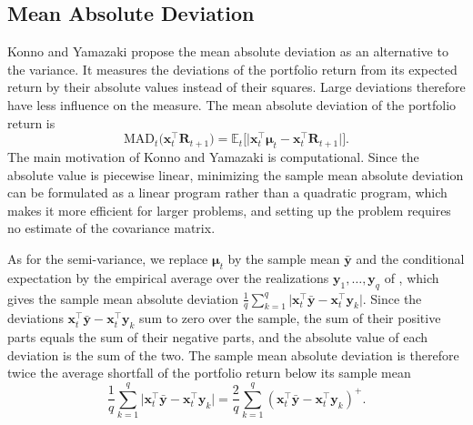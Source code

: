 \subsection{Mean Absolute Deviation}\label{sec:risk-mad}

Konno and Yamazaki \cite{KonnoYamazaki1991} propose the mean absolute deviation as an alternative to the variance. It
measures the deviations of the portfolio return from its expected return by their absolute values instead of their
squares. Large deviations therefore have less
influence on the measure. The mean absolute deviation of the portfolio return is
\begin{equation*}
    \text{MAD}_t\bigl( \bm{x}_t^\top \bm{R}_{t+1} \bigr)
    = \mathbb{E}_t\bigl[ \lvert \bm{x}_t^\top \bm{\mu}_t - \bm{x}_t^\top \bm{R}_{t+1} \rvert \bigr].
\end{equation*}
The main motivation of Konno and Yamazaki is computational. Since the absolute value is piecewise linear, minimizing the
sample mean absolute deviation can be formulated as a linear program rather than a quadratic program, which makes it more efficient for larger problems, 
and setting up the problem requires no estimate of the covariance matrix.

As for the semi-variance, we replace $\bm{\mu}_t$ by the sample mean $\bar{\bm{y}}$ and the conditional expectation by
the empirical average over the realizations $\bm{y}_1, \dots, \bm{y}_q$ of , which gives the
sample mean absolute deviation $\frac{1}{q} \sum_{k=1}^q \lvert \bm{x}_t^\top \bar{\bm{y}} - \bm{x}_t^\top \bm{y}_k
\rvert$. Since the deviations $\bm{x}_t^\top \bar{\bm{y}} - \bm{x}_t^\top \bm{y}_k$ sum to zero over the sample, the sum
of their positive parts equals the sum of their negative parts, and the absolute value of each deviation is the sum of
the two. The sample mean absolute deviation is therefore twice the average shortfall of the portfolio return below
its sample mean \cite{Speranza1993, OgryczakRuszczynski1999}
\begin{equation*}
    \frac{1}{q} \sum_{k=1}^q \lvert \bm{x}_t^\top \bar{\bm{y}} - \bm{x}_t^\top \bm{y}_k \rvert
    = \frac{2}{q} \sum_{k=1}^q (\bm{x}_t^\top \bar{\bm{y}} - \bm{x}_t^\top \bm{y}_k)^+.
\end{equation*}

